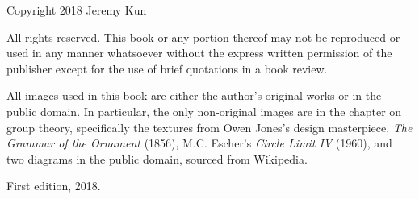 \thispagestyle{empty}

\begin{vplace}[0.7]
Copyright \textcopyright{} 2018 Jeremy Kun

\vspace{1cm}

All rights reserved. This book or any portion thereof may not be reproduced or
used in any manner whatsoever without the express written permission of the
publisher except for the use of brief quotations in a book review.

\vspace{1cm}

All images used in this book are either the author's original works or in the
public domain. In particular, the only non-original images are in the chapter
on group theory, specifically the textures from Owen Jones's design
masterpiece, \emph{The Grammar of the Ornament} (1856), M.C. Escher's
\emph{Circle Limit IV} (1960), and two diagrams in the public domain, sourced
from Wikipedia.

\vspace{1cm}

First edition, 2018.

\vspace{1cm}

\webpageurl{}
\end{vplace}

